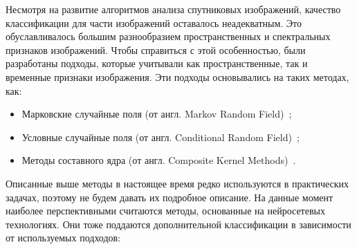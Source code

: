 \documentclass[14pt, russian]{scrartcl}
\begin{document}
Несмотря на развитие алгоритмов анализа спутниковых изображений, качество классификации для части изображений оставалось неадекватным. Это обуславливалось большим разнообразием пространственных и спектральных признаков изображений. Чтобы справиться с этой особенностью, были разработаны подходы, которые учитывали как пространственные, так и временные признаки изображения. Эти подходы основывались на таких методах, как:

\begin{itemize}
    \item Марковские случайные поля (от англ. Markov Random Field)~\cite{22};
    \item Условные случайные поля (от англ. Conditional Random Field)~\cite{23};
    \item Методы составного ядра (от англ. Composite Kernel Methods)~\cite{24}.
\end{itemize}

Описанные выше методы в настоящее время редко используются в практических задачах, поэтому не будем давать их подробное описание. На данные момент наиболее перспективными считаются методы, основанные на нейросетевых технологиях. Они тоже поддаются дополнительной классификации в зависимости от используемых подходов:
\end{document}
